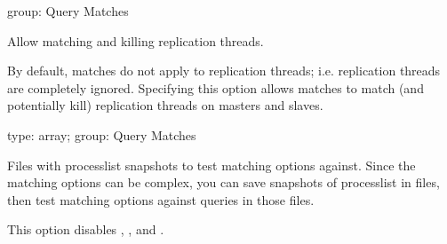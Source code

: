 \documentclass[letterpaper,10pt,english]{sphinxmanual}
\begin{document}
\begin{fulllineitems}
\label{\detokenize{mariadb-kill:cmdoption-mariadb-kill-replication-threads}}
\sphinxAtStartPar
group: Query Matches

\sphinxAtStartPar
Allow matching and killing replication threads.

\sphinxAtStartPar
By default, matches do not apply to replication threads; i.e. replication
threads are completely ignored.  Specifying this option allows matches to
match (and potentially kill) replication threads on masters and slaves.

\end{fulllineitems}


\begin{fulllineitems}
\label{\detokenize{mariadb-kill:cmdoption-mariadb-kill-test-matching}}
\sphinxAtStartPar
type: array; group: Query Matches

\sphinxAtStartPar
Files with processlist snapshots to test matching options against.  Since
the matching options can be complex, you can save snapshots of processlist
in files, then test matching options against queries in those files.

\sphinxAtStartPar
This option disables {\hyperref[\detokenize{mariadb-kill:cmdoption-mariadb-kill-run-time}]{}}, {\hyperref[\detokenize{mariadb-kill:cmdoption-mariadb-kill-interval}]{}},
and {\hyperref[\detokenize{mariadb-kill:cmdoption-mariadb-kill-no-ignore-self}]{}}.

\end{fulllineitems}
\end{document}
